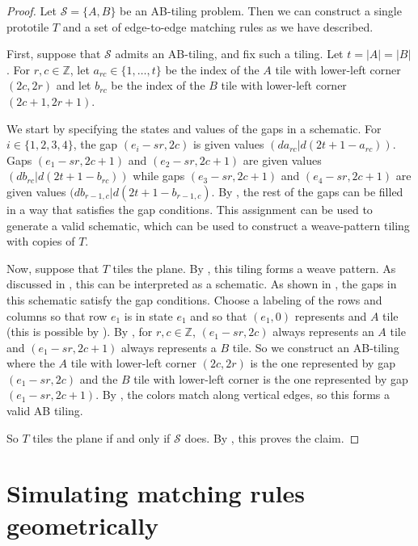 \documentclass[11pt]{article}
\theoremstyle{plain}
\theoremstyle{definition}
\begin{document}
\begin{proof}
Let $\mathcal{S}=\{A, B\}$ be an AB-tiling problem. Then we can construct a single prototile $T$ and a set of edge-to-edge matching rules as we have described.

First, suppose that $\mathcal{S}$ admits an AB-tiling, and fix such a tiling. Let $t=|A|=|B|$. For $r, c\in \mathbb{Z}$, let $a_{rc}\in \{1, \dots, t\}$ be the index of the $A$ tile with lower-left corner $(2c, 2r)$ and let $b_{rc}$ be the index of the $B$ tile with lower-left corner $(2c+1, 2r+1)$.

We start by specifying the states and values of the gaps in a schematic. For $i\in \{1, 2, 3, 4\}$, the gap $(e_i-sr, 2c)$ is given values $(da_{rc}|d(2t+1-a_{rc}))$. Gaps $(e_1-sr, 2c+1)$ and $(e_2-sr, 2c+1)$ are given values $(db_{rc}|d(2t+1-b_{rc}))$ while gaps $(e_3-sr, 2c+1)$ and $(e_4-sr, 2c+1)$ are given values $(db_{r-1, c}|d(2t+1-b_{r-1,c})$. By , the rest of the gaps can be filled in a way that satisfies the gap conditions. This assignment can be used to generate a valid schematic, which can be used to construct a weave-pattern tiling with copies of $T$. 

Now, suppose that $T$ tiles the plane. By , this tiling forms a weave pattern. As discussed in , this can be interpreted as a schematic. As shown in , the gaps in this schematic satisfy the gap conditions. Choose a labeling of the rows and columns so that row $e_1$ is in state $e_1$ and so that $(e_1, 0)$ represents and $A$ tile (this is possible by ). By , for $r, c\in \mathbb{Z}$, $(e_1-sr, 2c)$ always represents an $A$ tile and $(e_1-sr, 2c+1)$ always represents a $B$ tile. So we construct an AB-tiling where the $A$ tile with lower-left corner $(2c, 2r)$ is the one represented by gap $(e_1-sr, 2c)$ and the $B$ tile with lower-left corner is the one represented by gap $(e_1-sr, 2c+1)$. By , the colors match along vertical edges, so this forms a valid AB tiling.

So $T$ tiles the plane if and only if $\mathcal{S}$ does. By , this proves the claim.
\end{proof}

\section{Simulating matching rules geometrically}\label{sec:stapletile}
\end{document}
